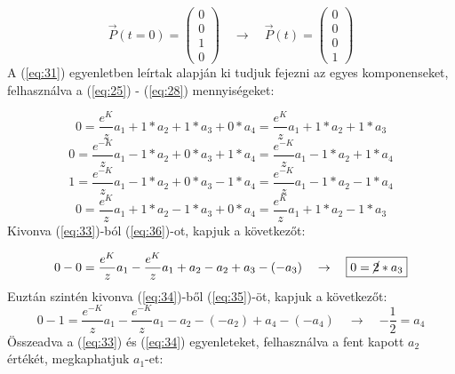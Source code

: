 \begin{equation} \label{eq:32}
    \vec{P} \left( t = 0 \right)
    =
    \begin{pmatrix}
        0 \\
        0 \\
        1 \\
        0
    \end{pmatrix}
    \quad \to \quad
    \vec{P} \left( t \right)
    =
    \begin{pmatrix}
        0 \\
        0 \\
        0 \\
        1
    \end{pmatrix}
\end{equation}
A (\ref{eq:31}) egyenletben leírtak alapján ki tudjuk fejezni az egyes komponenseket, felhasználva a (\ref{eq:25}) - (\ref{eq:28}) mennyiségeket:

\begin{equation} \label{eq:33}
    0
    =
    \frac{e^{K}}{z} a_{1} + 1 * a_{2} + 1 * a_{3} + 0 * a_{4}
    =
    \frac{e^{K}}{z} a_{1} + 1 * a_{2} + 1 * a_{3}
\end{equation}
\begin{equation} \label{eq:34}
    0
    =
    \frac{e^{-K}}{z} a_{1} - 1 * a_{2} + 0 * a_{3} + 1 * a_{4}
    =
    \frac{e^{-K}}{z} a_{1} - 1 * a_{2} + 1 * a_{4}
\end{equation}
\begin{equation} \label{eq:35}
    1
    =
    \frac{e^{-K}}{z} a_{1} - 1 * a_{2} + 0 * a_{3} - 1 * a_{4}
    =
    \frac{e^{-K}}{z} a_{1} - 1 * a_{2} - 1 * a_{4}
\end{equation}
\begin{equation} \label{eq:36}
    0
    =
    \frac{e^{K}}{z} a_{1} + 1 * a_{2} - 1 * a_{3} + 0 * a_{4}
    =
    \frac{e^{K}}{z} a_{1} + 1 * a_{2} - 1 * a_{3}
\end{equation}
Kivonva (\ref{eq:33})-ból (\ref{eq:36})-ot, kapjuk a következőt:

\begin{equation} \label{eq:37}
    0 - 0
    =
    \frac{e^{K}}{z} a_{1} - \frac{e^{K}}{z} a_{1} + a_{2} - a_{2} + a_{3} - \left( - a_{3} \right)
    \quad \to \quad
    \boxed{0 = \cancel{2} * a_{3}}
\end{equation}
Euztán szintén kivonva (\ref{eq:34})-ből (\ref{eq:35})-öt, kapjuk a következőt:
\begin{equation} \label{eq:38}
    0 - 1
    =
    \frac{e^{-K}}{z} a_{1} - \frac{e^{-K}}{z} a_{1} - a_{2} - \left(- a_{2} \right) + a_{4} - \left( - a_{4} \right)
    \quad \to \quad
    \boxed{-\frac{1}{2} = a_{4}}
\end{equation}
Összeadva a (\ref{eq:33}) és (\ref{eq:34}) egyenleteket, felhasználva a fent kapott $a_{2}$ értékét, megkaphatjuk $a_{1}$-et:


